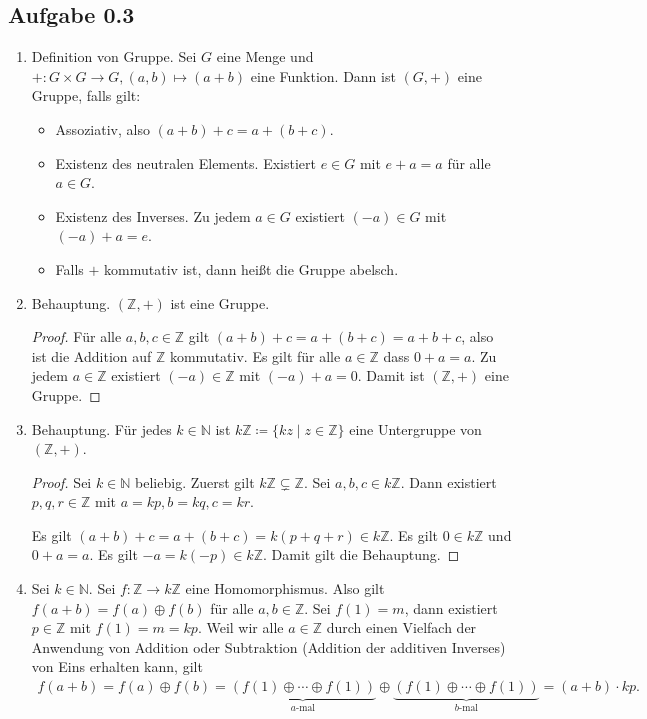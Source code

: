 \subsection*{Aufgabe 0.3}
\begin{enumerate}
\item Definition von Gruppe.  Sei \(G\) eine Menge und \(+\colon G \times G \to G,
  (a, b) \mapsto (a + b)\) eine Funktion.  Dann ist \((G, +)\) eine Gruppe,
  falls gilt:
  \begin{itemize}
  \item Assoziativ, also \((a+b)+c = a+(b+c)\).
  \item Existenz des neutralen Elements.  Existiert \(e \in G\) mit \(e
    + a = a\) für alle \(a \in G\).
  \item Existenz des Inverses.  Zu jedem \(a \in G\) existiert \((-a) \in
    G\) mit \((-a) + a = e\).
  \item Falls \(+\) kommutativ ist, dann heißt die Gruppe abelsch.
  \end{itemize}
\item Behauptung.  \((\mathbb{Z}, +)\) ist eine Gruppe.
  \begin{proof}
    Für alle \(a, b, c \in \mathbb{Z}\) gilt
    \((a+b)+c=a+(b+c)=a+b+c\), also ist die Addition auf
    \(\mathbb{Z}\) kommutativ.  Es gilt für alle \(a\in \mathbb{Z}\) dass
    \(0+a=a\). Zu jedem \(a \in \mathbb{Z}\) existiert \((-a) \in \mathbb{Z}\) mit \((-a) +
    a = 0\).  Damit ist \((\mathbb{Z}, +)\) eine Gruppe.
  \end{proof}

\item Behauptung.  Für jedes \(k \in \mathbb{N}\) ist \(k\mathbb{Z} \coloneq \{kz \mid z \in \mathbb{Z}\}\)
  eine Untergruppe von \((\mathbb{Z}, +)\).
  \begin{proof}
    Sei \(k \in \mathbb{N}\) beliebig.  Zuerst gilt \(k\mathbb{Z} \subsetneq \mathbb{Z}\).  Sei \(a, b, c \in
    k\mathbb{Z}\).  Dann existiert \(p, q, r \in \mathbb{Z}\) mit \(a = kp, b = kq, c =
    kr\).

    Es gilt \((a+b)+c = a+(b+c) = k(p+q+r) \in k\mathbb{Z}\).  Es gilt
    \(0 \in k\mathbb{Z}\) und \(0+a = a\).  Es gilt
    \(-a = k(-p) \in k\mathbb{Z}\).  Damit gilt die Behauptung.
  \end{proof}
\item Sei \(k \in \mathbb{N}\).  Sei
  \(f\colon \mathbb{Z} \to k\mathbb{Z}\) eine Homomorphismus.  Also gilt
  \(f(a + b) = f(a) \oplus f(b)\) für alle \(a, b \in \mathbb{Z}\).  Sei
  \(f(1) = m\), dann existiert \(p \in \mathbb{Z}\) mit
  \(f(1) = m = kp\).  Weil wir alle \(a \in \mathbb{Z}\) durch einen Vielfach der
  Anwendung von Addition oder Subtraktion (Addition der additiven
  Inverses) von Eins erhalten kann, gilt
  \begin{align*}
    f(a+b) = f(a) \oplus f(b)
    = \underbrace{(f(1) \oplus \cdots \oplus f(1))}_{a\text{-mal}} \oplus \underbrace{(f(1) \oplus \cdots \oplus f(1))}_{b\text{-mal}}
   = (a+b) \cdot kp.
  \end{align*}
\end{enumerate}
